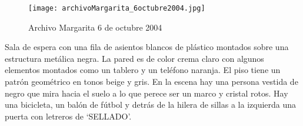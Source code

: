 \clearpage
\begin{figure}[h!]
    \centering
    \texttt{[image: archivoMargarita\_6octubre2004.jpg]}
    \caption{Archivo Margarita 6 de octubre 2004}
    \label{fig:archivoMargarita_6octubre2004}
\end{figure}

Sala de espera con una fila de asientos blancos de plástico montados sobre una estructura metálica negra. La pared es de color crema claro con algunos elementos montados como un tablero y un teléfono naranja. El piso tiene un patrón geométrico en tonos beige y gris. En la escena hay una persona vestida de negro que mira hacia el suelo a lo que perece ser un marco y cristal rotos. Hay una bicicleta, un balón de fútbol y detrás de la hilera de sillas a la izquierda una puerta con letreros de `SELLADO'.